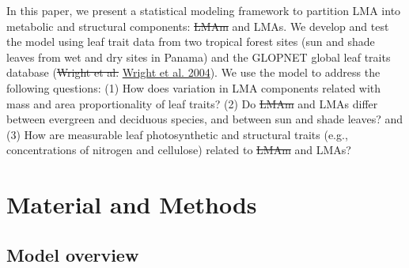\documentclass[
  12pt,
]{article}
\providecommand{\DIFaddtex}[1]{{\protect\color{blue}\uwave{#1}}} %
\providecommand{\DIFdeltex}[1]{{\protect\color{red}\sout{#1}}}                      %
\providecommand{\DIFaddbegin}{} %
\providecommand{\DIFaddend}{} %
\providecommand{\DIFdelbegin}{} %
\providecommand{\DIFdelend}{} %
\providecommand{\DIFadd}[1]{\texorpdfstring{\DIFaddtex{#1}}{#1}} %
\providecommand{\DIFdel}[1]{\texorpdfstring{\DIFdeltex{#1}}{}} %
\newcommand{\DIFscaledelfig}{0.5}
\newlength{\DIFdelgraphicswidth} %
\newlength{\DIFdelgraphicsheight} %
\newcommand{\DIFaddincludegraphics}[2][]{{\color{blue}\fbox{\DIFOincludegraphics[#1]{#2}}}} %
\newcommand{\DIFdelincludegraphics}[2][]{%
\sbox{\DIFdelgraphicsbox}{\DIFOincludegraphics[#1]{#2}}%
\settoboxwidth{\DIFdelgraphicswidth}{\DIFdelgraphicsbox} %
\settoboxtotalheight{\DIFdelgraphicsheight}{\DIFdelgraphicsbox} %
\scalebox{\DIFscaledelfig}{%
\parbox[b]{\DIFdelgraphicswidth}{\usebox{\DIFdelgraphicsbox}\\[-\baselineskip] \rule{\DIFdelgraphicswidth}{0em}}\llap{\resizebox{\DIFdelgraphicswidth}{\DIFdelgraphicsheight}{%
\setlength{\unitlength}{\DIFdelgraphicswidth}%
\begin{picture}(1,1)%
\thicklines\linethickness{2pt} %
{\color[rgb]{1,0,0}\put(0,0){\framebox(1,1){}}}%
{\color[rgb]{1,0,0}\put(0,0){\line( 1,1){1}}}%
{\color[rgb]{1,0,0}\put(0,1){\line(1,-1){1}}}%
\end{picture}%
}\hspace*{3pt}}} %
} %
\DeclareRobustCommand{\DIFaddbegin}{\DIFOaddbegin \let\includegraphics\DIFaddincludegraphics} %
\DeclareRobustCommand{\DIFaddend}{\DIFOaddend \let\includegraphics\DIFOincludegraphics} %
\DeclareRobustCommand{\DIFdelbegin}{\DIFOdelbegin \let\includegraphics\DIFdelincludegraphics} %
\DeclareRobustCommand{\DIFdelend}{\DIFOaddend \let\includegraphics\DIFOincludegraphics} %
\begin{document}
In this paper, we present a statistical modeling framework to partition LMA into metabolic and structural components: \DIFdelbegin \DIFdel{LMAm }\DIFdelend \DIFaddbegin \DIFadd{LMAp }\DIFaddend and LMAs.
We develop and test the model using leaf trait data from two tropical forest sites (sun and shade leaves from wet and dry sites in Panama) and the GLOPNET global leaf traits database (\DIFdelbegin \DIFdel{Wright et al. }\DIFdelend \protect\DIFdelbegin %
\DIFdelend \DIFaddbegin \hyperlink{ref-Wright2004a}{Wright et al. 2004}\DIFaddend ).
We use the model to address the following questions: (1) How does variation in LMA components related with mass and area proportionality of leaf traits? (2) Do \DIFdelbegin \DIFdel{LMAm }\DIFdelend \DIFaddbegin \DIFadd{LMAp }\DIFaddend and LMAs differ between evergreen and deciduous species, and between sun and shade leaves? and (3) How are measurable leaf photosynthetic and structural traits (e.g., concentrations of nitrogen and cellulose) related to \DIFdelbegin \DIFdel{LMAm }\DIFdelend \DIFaddbegin \DIFadd{LMAp }\DIFaddend and LMAs?

\hypertarget{material-and-methods}{%
\section{Material and Methods}\label{material-and-methods}}

\hypertarget{model-overview}{%
\subsection{Model overview}\label{model-overview}}
\end{document}
